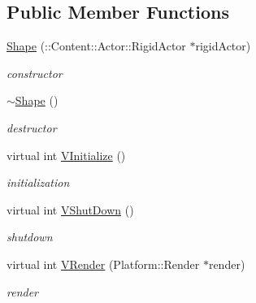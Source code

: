 \subsection*{Public Member Functions}
\begin{DoxyCompactItemize}
\item 
\hypertarget{classContent_1_1Shape_1_1Shape_a2489f94259d0fb547c9830fe2489bf43}{
\hyperlink{classContent_1_1Shape_1_1Shape_a2489f94259d0fb547c9830fe2489bf43}{Shape} (::Content::Actor::RigidActor $\ast$rigidActor)}
\label{classContent_1_1Shape_1_1Shape_a2489f94259d0fb547c9830fe2489bf43}

\begin{DoxyCompactList}\small\item\em constructor \item\end{DoxyCompactList}\item 
\hypertarget{classContent_1_1Shape_1_1Shape_a3e17cf1f62f79fa5d8b035dc4d0ec609}{
\hyperlink{classContent_1_1Shape_1_1Shape_a3e17cf1f62f79fa5d8b035dc4d0ec609}{$\sim$Shape} ()}
\label{classContent_1_1Shape_1_1Shape_a3e17cf1f62f79fa5d8b035dc4d0ec609}

\begin{DoxyCompactList}\small\item\em destructor \item\end{DoxyCompactList}\item 
\hypertarget{classContent_1_1Shape_1_1Shape_a5d6c86b864dbf6ce3efd68e6a6c112e5}{
virtual int \hyperlink{classContent_1_1Shape_1_1Shape_a5d6c86b864dbf6ce3efd68e6a6c112e5}{VInitialize} ()}
\label{classContent_1_1Shape_1_1Shape_a5d6c86b864dbf6ce3efd68e6a6c112e5}

\begin{DoxyCompactList}\small\item\em initialization \item\end{DoxyCompactList}\item 
\hypertarget{classContent_1_1Shape_1_1Shape_a554eac9f3e08a4b831a275ca597fd5b3}{
virtual int \hyperlink{classContent_1_1Shape_1_1Shape_a554eac9f3e08a4b831a275ca597fd5b3}{VShutDown} ()}
\label{classContent_1_1Shape_1_1Shape_a554eac9f3e08a4b831a275ca597fd5b3}

\begin{DoxyCompactList}\small\item\em shutdown \item\end{DoxyCompactList}\item 
\hypertarget{classContent_1_1Shape_1_1Shape_a226846ea1771ada0f4b961156f4967f2}{
virtual int \hyperlink{classContent_1_1Shape_1_1Shape_a226846ea1771ada0f4b961156f4967f2}{VRender} (Platform::Render $\ast$render)}
\label{classContent_1_1Shape_1_1Shape_a226846ea1771ada0f4b961156f4967f2}

\begin{DoxyCompactList}\small\item\em render \item\end{DoxyCompactList}\end{DoxyCompactItemize}
